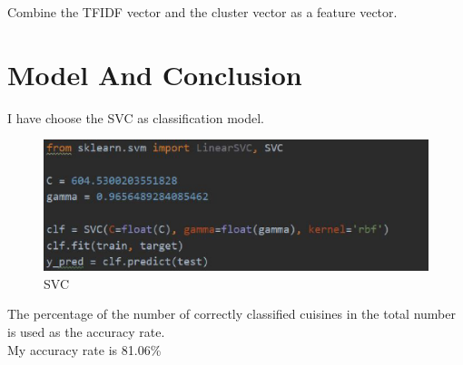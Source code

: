 \documentclass{amsart}
\begin{document}
Combine the TFIDF vector and the cluster vector as a feature vector.

\section{Model And Conclusion} \label{sec-conclusions}
I have choose the SVC as classification model.
\begin{figure}[htbp]
	\includegraphics[scale=0.7]{./figure1/8.eps}
	\caption{SVC}
\end{figure}
The percentage of the number of correctly classified cuisines in the total number is used as the accuracy rate.\\
My accuracy rate is 81.06\%






\newpage



\end{document}
